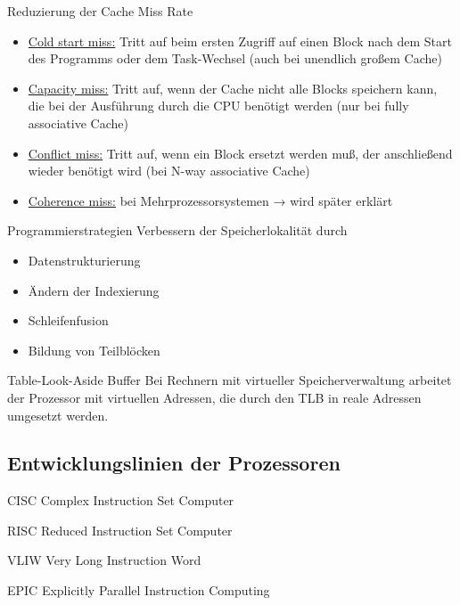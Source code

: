 \begin{defi}{Reduzierung der Cache Miss Rate}
    \begin{itemize}
        \item \underline{Cold start miss:} Tritt auf beim ersten Zugriff auf einen Block nach dem Start des Programms oder dem Task-Wechsel (auch bei unendlich großem Cache)
        \item \underline{Capacity miss:} Tritt auf, wenn der Cache nicht alle Blocks speichern kann, die bei der Ausführung durch die CPU benötigt werden (nur bei fully associative Cache)
        \item \underline{Conflict miss:} Tritt auf, wenn ein Block ersetzt werden muß, der anschließend wieder benötigt wird (bei N-way associative Cache)
        \item \underline{Coherence miss:} bei Mehrprozessorsystemen → wird später erklärt
    \end{itemize}
\end{defi}

\begin{defi}{Programmierstrategien}
    Verbessern der Speicherlokalität durch
    \begin{itemize}[\ldots]
        \item Datenstrukturierung
        \item Ändern der Indexierung
        \item Schleifenfusion
        \item Bildung von Teilblöcken
    \end{itemize}
\end{defi}

\begin{defi}{Table-Look-Aside Buffer}
    Bei Rechnern mit virtueller Speicherverwaltung arbeitet der Prozessor mit virtuellen Adressen, 
    die durch den TLB in reale Adressen umgesetzt werden.
\end{defi}

\subsection{Entwicklungslinien der Prozessoren}\label{subsec:entwicklungslinien-der-prozessoren}

\begin{defi}{CISC}
    Complex Instruction Set Computer
\end{defi}

\begin{defi}{RISC}
    Reduced Instruction Set Computer
\end{defi}

\begin{defi}{VLIW}
    Very Long Instruction Word
\end{defi}

\begin{defi}{EPIC}
    Explicitly Parallel Instruction Computing
\end{defi}